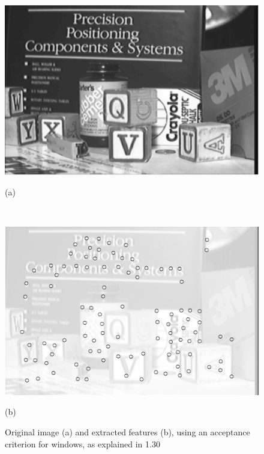 \documentclass[a4paper, onecolumn]{report}
\begin{document}
\begin{figure}[htb]
\centering
\begin{minipage}[c]{.40\textwidth}
\centering\setlength{\captionmargin}{0pt}%
\centerline{\includegraphics[width=1.5\textwidth]{images/features_original_image.jpeg}}
(a)
\end{minipage} \\
\vspace{10mm}%
\begin{minipage}[c]{.40\textwidth}
\centering\setlength{\captionmargin}{0pt}%
\centerline{\includegraphics[width=1.5\textwidth]{images/features_extracted_features.jpeg}}
(b)
\end{minipage}
\caption{Original image (a) and extracted features (b), using an acceptance criterion for windows, as explained in 1.30}
\end{figure}
 
\end{document}
